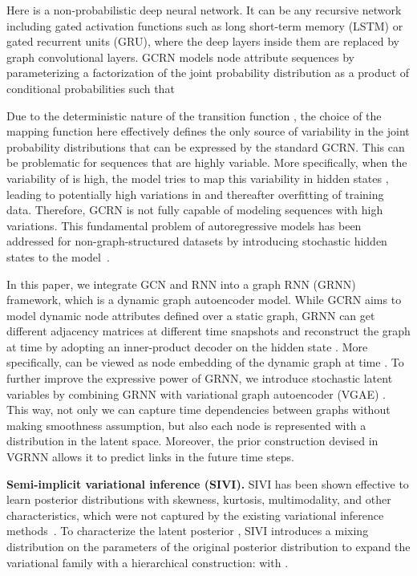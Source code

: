 \documentclass{article}
\begin{document}
Here  is a non-probabilistic deep neural network.
It can be any recursive network including gated activation functions such as long short-term memory (LSTM) or gated recurrent units (GRU), where the deep layers inside them are replaced by graph convolutional layers.
GCRN models node attribute sequences by parameterizing a factorization of
the joint probability distribution as a product of conditional probabilities such that

Due to the deterministic nature of the transition function , the choice of the mapping function  here effectively defines the only source of variability in the joint probability distributions  that can be expressed by the standard GCRN. 
This can be problematic for sequences that are highly variable. 
More specifically, when the variability of  is high, the model tries to map this variability in hidden states , leading to potentially high variations in  and thereafter overfitting of training data. Therefore, GCRN is not fully capable of modeling sequences with high variations. 
This fundamental problem of autoregressive models has been addressed for non-graph-structured datasets by introducing stochastic hidden states to the model~\cite{fraccaro2016sequential, chung2015recurrent, goyal2017z}. 

In this paper, we integrate GCN and RNN into a graph RNN (GRNN) framework, which is a dynamic graph autoencoder model. While GCRN aims to model dynamic node attributes defined over a static graph, GRNN can get different adjacency matrices at different time snapshots and reconstruct the graph at time  by adopting an inner-product decoder on the hidden state . More specifically,  can be viewed as node embedding of the dynamic graph at time . To further improve the expressive power of GRNN, we introduce stochastic latent variables by combining GRNN with variational graph autoencoder (VGAE) \cite{kipf2016variational}. This way, not only we can capture time dependencies between graphs without making smoothness assumption, but also each node is represented with a distribution in the latent space. Moreover, the prior construction devised in VGRNN allows it to predict links in the future time steps.

\noindent\textbf{Semi-implicit variational inference (SIVI).} 
SIVI has been shown effective to learn posterior distributions with skewness, kurtosis, multimodality, and other characteristics, which were not captured by the existing variational inference methods~\cite{yin2018semi}. To characterize the latent posterior , SIVI introduces a mixing distribution on the parameters of the original posterior distribution to expand the variational family with a hierarchical construction:  with . 
 \iffalse
\end{document}

